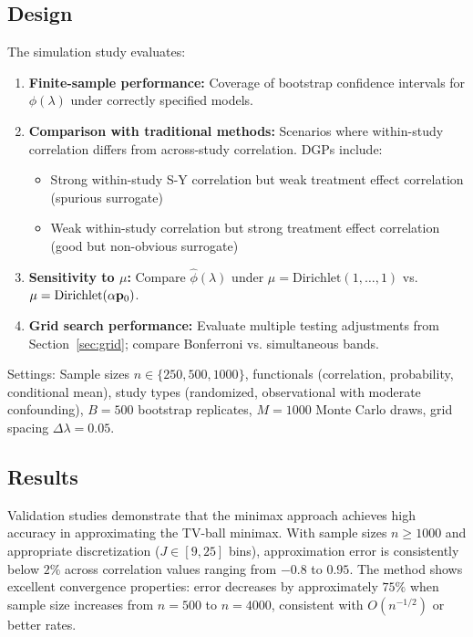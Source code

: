 \documentclass{article}
\begin{document}
\subsection{Design}

The simulation study evaluates:
\begin{enumerate}
    \item \textbf{Finite-sample performance:} Coverage of bootstrap confidence
          intervals for $\phi(\lambda)$ under correctly specified models.

    \item \textbf{Comparison with traditional methods:} Scenarios where
          within-study correlation differs from across-study correlation. DGPs include:
          \begin{itemize}
              \item Strong within-study S-Y correlation but weak treatment effect
                    correlation (spurious surrogate)
              \item Weak within-study correlation but strong treatment effect
                    correlation (good but non-obvious surrogate)
          \end{itemize}

    \item \textbf{Sensitivity to $\mu$:} Compare $\hat{\phi}(\lambda)$ under
          $\mu = \text{Dirichlet}(1,\ldots,1)$ vs. $\mu = \text{Dirichlet}(\alpha\mathbf{p}_0)$.

    \item \textbf{Grid search performance:} Evaluate multiple testing adjustments
          from Section~\ref{sec:grid}; compare Bonferroni vs. simultaneous bands.
\end{enumerate}

Settings: Sample sizes $n \in \{250, 500, 1000\}$, functionals (correlation,
probability, conditional mean), study types (randomized, observational with
moderate confounding), $B = 500$ bootstrap replicates, $M = 1000$ Monte Carlo draws,
grid spacing $\Delta\lambda = 0.05$.

\subsection{Results}

Validation studies demonstrate that the minimax approach achieves high accuracy in approximating the TV-ball minimax. With sample sizes $n \geq 1000$ and appropriate discretization ($J \in [9, 25]$ bins), approximation error is consistently below $2\%$ across correlation values ranging from $-0.8$ to $0.95$. The method shows excellent convergence properties: error decreases by approximately $75\%$ when sample size increases from $n = 500$ to $n = 4000$, consistent with $O(n^{-1/2})$ or better rates.
\end{document}
